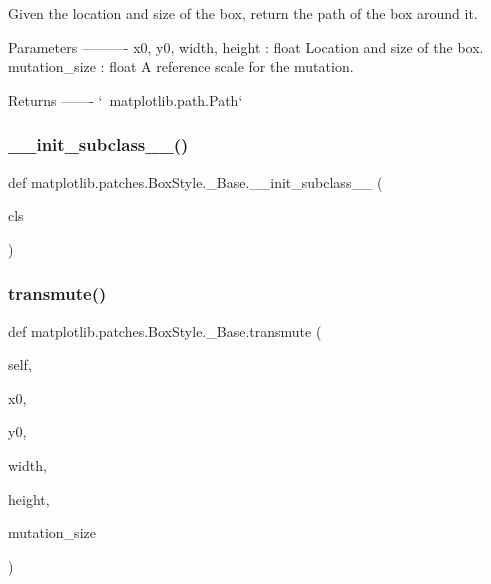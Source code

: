 \begin{DoxyVerb}Given the location and size of the box, return the path of
the box around it.

Parameters
----------
x0, y0, width, height : float
    Location and size of the box.
mutation_size : float
    A reference scale for the mutation.

Returns
-------
`~matplotlib.path.Path`
\end{DoxyVerb}
 \mbox{\label{classmatplotlib_1_1patches_1_1BoxStyle_1_1__Base_aafcc297fae4af42b9859b7722cde7361}} 
\subsubsection{\texorpdfstring{\+\_\+\+\_\+init\+\_\+subclass\+\_\+\+\_\+()}{\_\_init\_subclass\_\_()}}
{\footnotesize\ttfamily def matplotlib.\+patches.\+Box\+Style.\+\_\+\+Base.\+\_\+\+\_\+init\+\_\+subclass\+\_\+\+\_\+ (\begin{DoxyParamCaption}\item[{}]{cls }\end{DoxyParamCaption})}

\mbox{\label{classmatplotlib_1_1patches_1_1BoxStyle_1_1__Base_a36da6e983df703c4a533991fc41508be}} 
\subsubsection{\texorpdfstring{transmute()}{transmute()}}
{\footnotesize\ttfamily def matplotlib.\+patches.\+Box\+Style.\+\_\+\+Base.\+transmute (\begin{DoxyParamCaption}\item[{}]{self,  }\item[{}]{x0,  }\item[{}]{y0,  }\item[{}]{width,  }\item[{}]{height,  }\item[{}]{mutation\+\_\+size }\end{DoxyParamCaption})}


